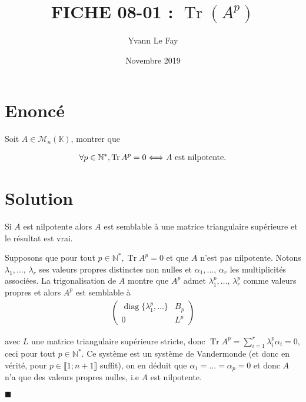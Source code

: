 \documentclass{article}
\newcommand*{\QED}{\hfill\ensuremath{\blacksquare}}%
\DeclareMathOperator{\diag}{diag}
\DeclareMathOperator{\tr}{Tr}
\begin{document}
\title{FICHE 08-01 : $\tr(A^p)$}
\author{Yvann Le Fay}
\date{Novembre 2019}
\maketitle
\section*{Enoncé}
Soit $A\in \mathcal{M}_n(\mathbb{K})$, montrer que 

\begin{align*}
	\forall p \in \mathbb{N}^*, \tr{A^p} = 0 \Longleftrightarrow A \textup{ est nilpotente}.
\end{align*}
\section*{Solution}
Si $A$ est nilpotente alors $A$ est semblable à une matrice triangulaire supérieure et le résultat est vrai.

Supposons que pour tout $p\in \mathbb{N}^*, \tr{A^p} = 0$ et que $A$ n'est pas nilpotente. Notons $\lambda_1, \ldots, \,\lambda_r$ ses valeurs propres distinctes non nulles et $\alpha_1, \ldots, \,\alpha_r$ les multiplicités associées. La trigonalisation de $A$ montre que $A^p$ admet $\lambda_1^p, \ldots, \,\lambda_r^p$ comme valeurs propres et alors $A^p$ est semblable à 
\begin{align*}
	\begin{pmatrix}
		\diag\{\lambda_1^p, \ldots\} & B_p \\
		0 & L^p
	\end{pmatrix}
\end{align*}

avec $L$ une matrice triangulaire supérieure stricte, donc $\tr A^p = \sum_{i=1}^r \lambda_i^p \alpha_i = 0$, ceci pour tout $p\in \mathbb{N}^*$. Ce système est un système de Vandermonde (et donc en vérité, pour $p\in \llbracket 1; n+1\rrbracket$ suffit), on en déduit que $\alpha_1 = \ldots  = \alpha_p = 0$ et donc $A$ n'a que des valeurs propres nulles, i.e $A$ est nilpotente. 

\QED
\end{document}
